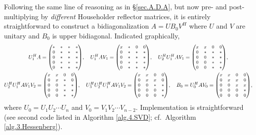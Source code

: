 \noindent Following the same line of reasoning as in \S \ref{sec.A.D.A}, but now pre- and post-multiplying by {\it different} Householder reflector matrices,
it is entirely straightforward to construct a bidiagonalization $A=U B_0 V^H$ where $U$ and $V$ are unitary and $B_0$ is upper bidiagonal.  
Indicated graphically, 
\begin{gather*}
  U^H_1 A = {\footnotesize\begin{pmatrix} * & * & * & * \\ 0 & * & * & * \\ 0 & * & * & * \\ 0 & * & * & * \\ 0 & * & * & * \end{pmatrix}}, \quad
  U^H_1 A V_1 = {\footnotesize\begin{pmatrix} x & * & 0 & 0 \\ 0 & * & * & * \\ 0 & * & * & * \\ 0 & * & * & * \\ 0 & * & * & * \end{pmatrix}}, \quad
  U^H_2 U^H_1 A V_1 = {\footnotesize\begin{pmatrix} x & x & 0 & 0 \\ 0 & * & * & * \\ 0 & 0 & * & * \\ 0 & 0 & * & * \\ 0 & 0 & * & * \end{pmatrix}}, \\
  U^H_2 U^H_1 A V_1 V_2 = {\footnotesize\begin{pmatrix} x & x & 0 & 0 \\ 0 & x & * & 0 \\ 0 & 0 & * & * \\ 0 & 0 & * & * \\ 0 & 0 & * & * \end{pmatrix}}, \quad
  U^H_3 U^H_2 U^H_1 A V_1 V_2 = {\footnotesize\begin{pmatrix} x & x & 0 & 0 \\ 0 & x & x & 0 \\ 0 & 0 & * & * \\ 0 & 0 & 0 & * \\ 0 & 0 & 0 & * \end{pmatrix}}, \quad
  B_0 = U^H_0 A V_0 = {\footnotesize\begin{pmatrix} x & x & 0 & 0 \\ 0 & x & x & 0 \\ 0 & 0 & x & x \\ 0 & 0 & 0 & * \\ 0 & 0 & 0 & 0 \end{pmatrix}},
\end{gather*}
where $U_0=U_1 U_2 \cdots U_n$ and $V_0=V_1 V_2\cdots V_{n-2}$.  Implementation is straightforward (see second code listed in Algorithm \ref{alg.4.SVD}; cf.~Algorithm \ref{alg.3.Hessenberg}).

